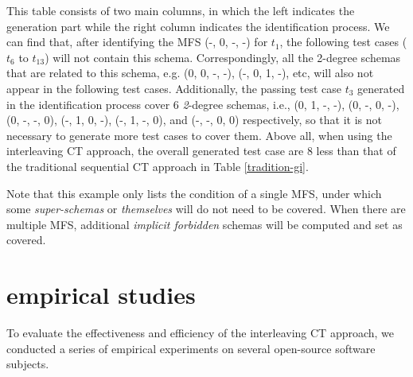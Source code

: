 \documentclass{sig-alternate}
\begin{document}
This table consists of two main columns, in which the left indicates the generation part while the right column indicates the identification process. We can find that, after identifying the MFS (-, 0, -, -) for $t_{1}$, the following test cases ($t_{6}$ to $t_{13}$) will not contain this schema. Correspondingly, all the 2-degree schemas that are related to this schema, e.g. (0, 0, -, -), (-, 0, 1, -), etc, will also not appear in the following test cases. Additionally, the passing test case $t_{3}$ generated in the identification process cover 6 \emph{2}-degree schemas, i.e., (0, 1, -, -), (0, -, 0, -), (0, -, -, 0), (-, 1, 0, -), (-, 1, -, 0), and (-, -, 0, 0) respectively, so that it is not necessary to generate more test cases to cover them.  Above all, when using the interleaving CT approach,  the overall generated test case are 8 less than that of the traditional sequential CT approach in Table \ref{tradition-gi}.

Note that this example only lists the condition of a single MFS, under which some \emph{super-schemas} or \emph{themselves} will do not need to be covered.  When there are multiple MFS, additional \emph{implicit forbidden} schemas will be computed and set as covered.



%
%

\section{empirical studies}
To evaluate the effectiveness and efficiency of the interleaving CT approach, we conducted a series of empirical experiments on several open-source software subjects.
\end{document}
